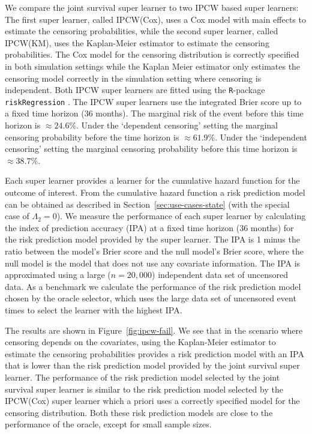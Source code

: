 \documentclass[lineno]{biometrika}
\newcommand{\1}{\mathds{1}}
\begin{document}
We compare the joint survival super learner to two IPCW based super learners: The
first super learner, called IPCW(Cox), uses a Cox model with main
effects to estimate the censoring probabilities, while the second
super learner, called IPCW(KM), uses the Kaplan-Meier estimator to
estimate the censoring probabilities. The Cox model for the censoring
distribution is correctly specified in both simulation settings while
the Kaplan Meier estimator only estimates the censoring model
correctly in the simulation setting where censoring is
independent. Both IPCW super learners are fitted using the
\texttt{R}-package \texttt{riskRegression}
\citep{Gerds_Ohlendorff_Ozenne_2023}.
%
%
The IPCW super learners use the integrated Brier score up to a fixed time
horizon (36 months). The marginal risk of the event before this time horizon is
\(\approx 24.6\)\%. Under the `dependent censoring' setting the marginal
censoring probability before the time horizon is \(\approx 61.9\)\%. Under the
`independent censoring' setting the marginal censoring probability before this
time horizon is \( \approx 38.7 \)\%.

Each super learner provides a learner for the cumulative
hazard function for the outcome of interest. From the
cumulative hazard function a risk prediction model can be
obtained as described in Section~\ref{sec:use-cases-state}
(with the special case of $\Lambda_2 = 0$). We measure the
performance of each super learner by calculating the index of
prediction accuracy (IPA) \citep{kattan2018index} at a fixed
time horizon (36 months) for the risk prediction model
provided by the super learner. The IPA is 1 minus the ratio
between the model's Brier score and the null model's Brier
score, where the null model is the model that does not use any
covariate information. The IPA is approximated using a large
(\( n = 20,000 \)) independent data set of uncensored data. As
a benchmark we calculate the performance of the risk
prediction model chosen by the oracle selector, which uses the
large data set of uncensored event times to select the learner
with the highest IPA.

The results are shown in Figure~\ref{fig:ipcw-fail}. We see that in
the scenario where censoring depends on the covariates, using the
Kaplan-Meier estimator to estimate the censoring probabilities
provides a risk prediction model with an IPA that is lower than the
risk prediction model provided by the joint survival super learner. The performance
of the risk prediction model selected by the joint survival super learner is similar
to the risk prediction model selected by the IPCW(Cox) super learner
which a priori uses a correctly specified model for the censoring
distribution. Both these risk prediction models are close to the
performance of the oracle, except for small sample sizes.
\end{document}
